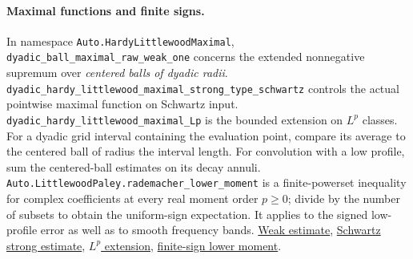 \documentclass[11pt,letterpaper]{article}
\theoremstyle{definition}
\begin{document}
\paragraph{Maximal functions and finite signs.}
In namespace \nolinkurl{Auto.HardyLittlewoodMaximal}, \nolinkurl{dyadic_ball_maximal_raw_weak_one} concerns the extended nonnegative supremum over \emph{centered balls of dyadic radii}. \nolinkurl{dyadic_hardy_littlewood_maximal_strong_type_schwartz} controls the actual pointwise maximal function on Schwartz input. \nolinkurl{dyadic_hardy_littlewood_maximal_Lp} is the bounded extension on \(L^p\) classes. For a dyadic grid interval containing the evaluation point, compare its average to the centered ball of radius the interval length. For convolution with a low profile, sum the centered-ball estimates on its decay annuli. \nolinkurl{Auto.LittlewoodPaley.rademacher_lower_moment} is a finite-powerset inequality for complex coefficients at every real moment order \(p\ge0\); divide by the number of subsets to obtain the uniform-sign expectation. It applies to the signed low-profile error as well as to smooth frequency bands. \href{https://github.com/roos-j/lean-spherical/blob/800b71afca91e42809c21e6e2fd9ae4f82467082/LeanSpherical/Auto/HardyLittlewoodMaximal.lean#L330}{Weak estimate}, \href{https://github.com/roos-j/lean-spherical/blob/800b71afca91e42809c21e6e2fd9ae4f82467082/LeanSpherical/Auto/HardyLittlewoodMaximal.lean#L1043}{Schwartz strong estimate}, \href{https://github.com/roos-j/lean-spherical/blob/800b71afca91e42809c21e6e2fd9ae4f82467082/LeanSpherical/Auto/HardyLittlewoodMaximal.lean#L1326}{\(L^p\) extension}, \href{https://github.com/roos-j/lean-spherical/blob/800b71afca91e42809c21e6e2fd9ae4f82467082/LeanSpherical/Auto/LittlewoodPaley.lean#L1357}{finite-sign lower moment}.
\end{document}
